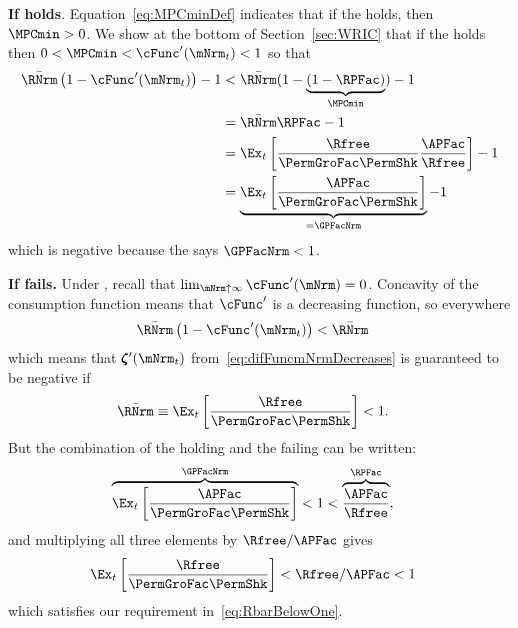 \documentclass[\econtexRoot/BufferStockTheory]{subfiles}
\begin{document}
\textbf{If {\RIC} holds}. Equation~\eqref{eq:MPCminDef} indicates that if the {\RIC} holds, then $\MPCmin >0$.  We show at the bottom of Section~\ref{sec:WRIC} that if the {\RIC} holds then $0 < \MPCmin < \cFunc^{\prime}(\mNrm_{t}) < 1$ so that 
\begin{align*}
  \bar{\RNrm}\left(1-\cFunc^{\prime}({\mNrm}_t)\right) - 1 & <  \bar{\RNrm}(1-\underbrace{(1-\RPFac)}_{\MPCmin}) - 1  \\
                                                            & = \bar{\RNrm}\RPFac - 1 \\
                                                            & = \Ex_{t}\left[\frac{\Rfree}{\PermGroFac \PermShk}\frac{\APFac}{\Rfree}\right] - 1 \\
                                                            & = \underbrace{\Ex_{t}\left[\frac{\APFac}{\PermGroFac \PermShk}\right]}_{= \GPFacNrm} - 1 
\end{align*}
which is negative because the {\GICMod} says $\GPFacNrm < 1$.  

\textbf{If {\RIC} fails.}
Under \cncl{\RIC}, recall that $\lim_{\mNrm \uparrow \infty} \cFunc^{\prime}(\mNrm) = 0$.  Concavity of the consumption function means that $\cFunc^{\prime}$ is a decreasing function, so everywhere 
\begin{align*}
  \bar{\RNrm}\left(1-\cFunc^{\prime}({\mNrm}_t)\right) & < \bar{\RNrm}
\end{align*}
which means that $\difFunc^{\prime}(\mNrm_{t})$ from~\eqref{eq:difFuncmNrmDecreases} is guaranteed to be negative if
\begin{equation}\begin{gathered}\begin{aligned}
  \bar{\RNrm} \equiv \Ex_{t}\left[\frac{\Rfree}{\PermGroFac \PermShk}\right] & < 1  \label{eq:RbarBelowOne}.
\end{aligned}\end{gathered}\end{equation}
But the combination of the {\GICMod} holding and the {\RIC} failing can be written:
\begin{align*}
  \overbrace{\Ex_{t}\left[\frac{\APFac}{\PermGroFac \PermShk}\right]}^{\GPFacNrm} & < 1 < \overbrace{\frac{\APFac}{\Rfree}}^{{\RPFac}},
\end{align*}
and multiplying all three elements by $\Rfree/\APFac$ gives 
\begin{align*}
  \Ex_{t}\left[\frac{\Rfree}{\PermGroFac \PermShk}\right] & < \Rfree/\APFac < 1
\end{align*}
which satisfies our requirement in~\eqref{eq:RbarBelowOne}.
\end{document}

